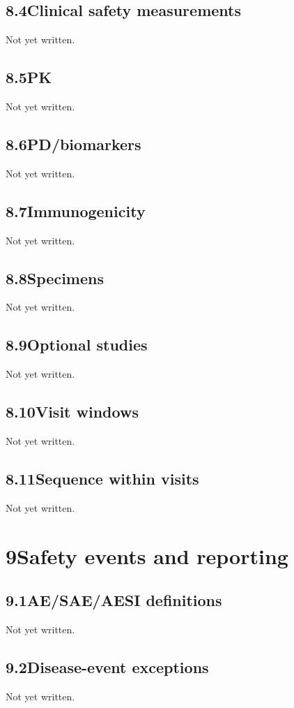 \documentclass[11pt,a4paper]{article}
\newcommand{\psnote}[2]{\par\noindent\colorbox{#1!8}{\parbox{\dimexpr\linewidth-2\fboxsep}{\small\color{#1}#2}}\par}
\begin{document}
\subsection{8.4\quad Clinical safety measurements}\label{section.8.4}
\psnote{pswarn}{Not yet written.}
\subsection{8.5\quad PK}\label{section.8.5}
\psnote{pswarn}{Not yet written.}
\subsection{8.6\quad PD/biomarkers}\label{section.8.6}
\psnote{pswarn}{Not yet written.}
\subsection{8.7\quad Immunogenicity}\label{section.8.7}
\psnote{pswarn}{Not yet written.}
\subsection{8.8\quad Specimens}\label{section.8.8}
\psnote{pswarn}{Not yet written.}
\subsection{8.9\quad Optional studies}\label{section.8.9}
\psnote{pswarn}{Not yet written.}
\subsection{8.10\quad Visit windows}\label{section.8.10}
\psnote{pswarn}{Not yet written.}
\subsection{8.11\quad Sequence within visits}\label{section.8.11}
\psnote{pswarn}{Not yet written.}
\section{9\quad Safety events and reporting}\label{section.9}
\subsection{9.1\quad AE/SAE/AESI definitions}\label{section.9.1}
\psnote{pswarn}{Not yet written.}
\subsection{9.2\quad Disease-event exceptions}\label{section.9.2}
\psnote{pswarn}{Not yet written.}
\end{document}
